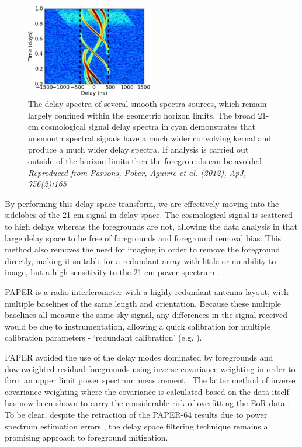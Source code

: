 \begin{figure}
\begin{center}
    \includegraphics[width=0.5\textwidth]{Chapman_Jelic/Images/horizon.jpg}
\end{center}
    \caption{The delay spectra of several smooth-spectra sources, which remain largely confined within the geometric horizon limits. The broad 21-cm cosmological signal delay spectra in cyan demonstrates that unsmooth spectral signals have a much wider convolving kernal and produce a much wider delay spectra. If analysis is carried out outside of the horizon limits then the foregrounds can be avoided. \textit{Reproduced from Parsons, Pober, Aguirre et al. (2012), ApJ, 756(2):165}}
    \label{fig:horizon}
\end{figure}

By performing this delay space transform, we are effectively moving into the sidelobes of the 21-cm signal in delay space. The cosmological signal is scattered to high delays whereas the foregrounds are not, allowing the data analysis in that large delay space to be free of foregrounds and foreground removal bias. This method also removes the need for imaging in order to remove the foreground directly, making it suitable for a redundant array with little or no ability to image, but a high sensitivity to the 21-cm power spectrum \cite{Parsons2012ApJ...753...81P}.   

PAPER is a radio interferometer with a highly redundant antenna layout, with multiple baselines of the same length and orientation. Because these multiple baselines all measure the same sky signal, any differences in the signal received would be due to instrumentation, allowing a quick calibration for multiple calibration parameters - `redundant calibration' (e.g. \cite{Ronniy2018AJ....156..285J,Li2018ApJ...863..170L,Dillon2016ApJ...826..181D,Zheng2014MNRAS.445.1084Z,Wieringa1992ExA.....2..203W}). 

PAPER avoided the use of the delay modes dominated by foregrounds and downweighted residual foregrounds using inverse covariance weighting in order to form an upper limit power spectrum measurement \cite{Ali2015ApJ...809...61A}. The latter method of inverse covariance weighting where the covariance is calculated based on the data itself has now been shown to carry the considerable risk of overfitting the EoR data \cite{Cheng2018ApJ...868...26C}. To be clear, despite the retraction of the PAPER-64 results due to power spectrum estimation errors \cite{Ali2018ApJ...863..201A}, the delay space filtering technique remains a promising approach to foreground mitigation.

